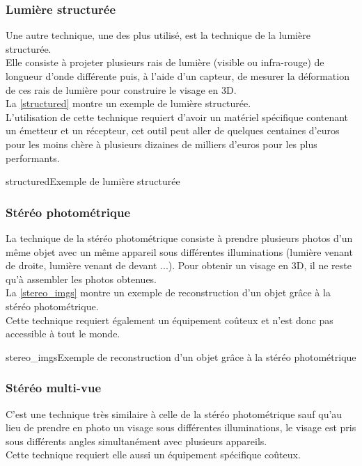 \documentclass[overfullbox, poster]{polytech/polytech}
\begin{document}
\subsubsection{Lumière structurée}
\label{struc_light}
Une autre technique, une des plus utilisé, est la technique de la lumière structurée.\\
Elle consiste à projeter plusieurs rais de lumière (visible ou infra-rouge) de longueur d'onde différente puis, à l'aide d'un capteur, de mesurer la déformation de ces rais de lumière pour construire le visage en 3D.\\
La \autoref{structured} montre un exemple de lumière structurée.\\
L'utilisation de cette technique requiert d'avoir un matériel spécifique contenant un émetteur et un récepteur, cet outil peut aller de quelques centaines d'euros pour les moins chère à plusieurs dizaines de milliers d'euros pour les plus performants.

\begin{Figure}{structured}{Exemple de lumière structurée}
\end{Figure}

\subsubsection{Stéréo photométrique}
\label{photo_stereo}
La technique de la stéréo photométrique consiste à prendre plusieurs photos d'un même objet avec un même appareil sous différentes illuminations (lumière venant de droite, lumière venant de devant ...). Pour obtenir un visage en 3D, il ne reste qu'à assembler les photos obtenues.\\
La \autoref{stereo_imgs} montre un exemple de reconstruction d'un objet grâce à la stéréo photométrique.\\
Cette technique requiert également un équipement coûteux et n'est donc pas accessible à tout le monde.

\begin{Figure}{stereo_imgs}{Exemple de reconstruction d'un objet grâce à la stéréo photométrique}
\end{Figure}


\subsubsection{Stéréo multi-vue}
\label{multi_stereo}
C'est une technique très similaire à celle de la stéréo photométrique sauf qu'au lieu de prendre en photo un visage sous différentes illuminations, le visage est pris sous différents angles simultanément avec plusieurs appareils.\\
Cette technique requiert elle aussi un équipement spécifique coûteux.\\
\\
\\
\end{document}
